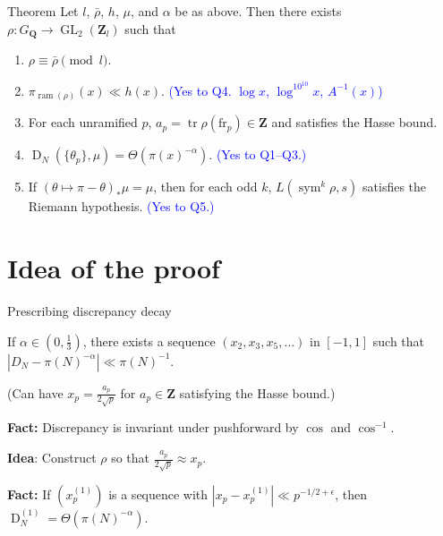 \documentclass[handout]{beamer}
\DeclareMathOperator{\D}{D}
\DeclareMathOperator{\GL}{GL}
\DeclareMathOperator{\ram}{ram}
\DeclareMathOperator{\sym}{sym}
\DeclareMathOperator{\tr}{tr}
\newcommand{\bQ}{\mathbf{Q}}
\newcommand{\bZ}{\mathbf{Z}}
\newcommand{\frob}{\mathrm{fr}}
\begin{document}
\begin{frame}{Theorem}
Let $l$, $\bar\rho$, $h$, $\mu$, and $\alpha$ be as above. Then there exists 
$\rho\colon G_\bQ \to \GL_2(\bZ_l)$ such that 
\begin{enumerate}
\item
$\rho \equiv \bar\rho\pmod{l}$. 
\pause

\item
$\pi_{\ram(\rho)}(x) \ll h(x)$. 
\pause
\textcolor{blue}{(Yes to Q4. 
\pause
$\log x$, 
\pause
$\log^{10^{10}}x$, 
\pause
$A^{-1}(x)$)}
\pause

\item
For each unramified $p$, $a_p = \tr \rho(\frob_p)\in \bZ$ and satisfies the 
Hasse bound.
\pause

\item
$\D_N(\{\theta_p\},\mu) = \Theta(\pi(x)^{-\alpha})$. 
\pause
\textcolor{blue}{(Yes to Q1--Q3.)}
\pause

\item
If $(\theta\mapsto \pi-\theta)_\ast \mu = \mu$, then for each odd $k$, 
$L(\sym^k \rho,s)$ satisfies the Riemann hypothesis. 
\pause
\textcolor{blue}{(Yes to Q5.)}
\end{enumerate}
\end{frame}






\section{Idea of the proof}


\begin{frame}{Prescribing discrepancy decay}
\begin{theorem}
If $\alpha\in \left(0,\frac 1 3\right)$, there exists a sequence 
$(x_2,x_3,x_5,\dots)$ in $[-1,1]$ such that 
$| D_N - \pi(N)^{-\alpha}| \ll \pi(N)^{-1}$. 
\end{theorem}
\pause

(Can have $x_p = \frac{a_p}{2\sqrt p}$ for $a_p\in \bZ$ satisfying the 
Hasse bound.) 
\pause

\textbf{Fact:} 
Discrepancy is invariant under pushforward by $\cos$ and $\cos^{-1}$. 
\pause

\textbf{Idea}:
Construct $\rho$ so that $\frac{a_p}{2\sqrt p}\approx x_p$. 
\pause

\textbf{Fact:} 
If $(x_p^{(1)})$ is a sequence with $|x_p - x_p^{(1)}| \ll p^{-1/2+\epsilon}$, 
then $\D_N^{(1)} = \Theta(\pi(N)^{-\alpha})$. 
\end{frame}
\end{document}

